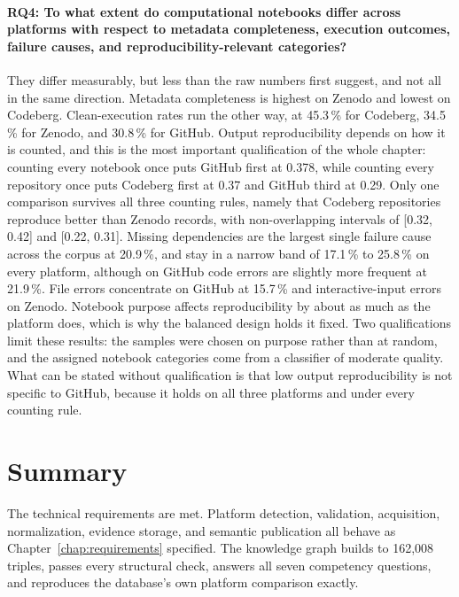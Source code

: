 \paragraph{RQ4: To what extent do computational notebooks differ across platforms with respect to metadata completeness, execution outcomes, failure causes, and reproducibility-relevant categories?}
They differ measurably, but less than the raw numbers first suggest, and not all in the same direction. Metadata completeness is highest on Zenodo and lowest on Codeberg. Clean-execution rates run the other way, at 45.3\,\% for Codeberg, 34.5\,\% for Zenodo, and 30.8\,\% for GitHub. Output reproducibility depends on how it is counted, and this is the most important qualification of the whole chapter: counting every notebook once puts GitHub first at 0.378, while counting every repository once puts Codeberg first at 0.37 and GitHub third at 0.29. Only one comparison survives all three counting rules, namely that Codeberg repositories reproduce better than Zenodo records, with non-overlapping intervals of [0.32, 0.42] and [0.22, 0.31]. Missing dependencies are the largest single failure cause across the corpus at 20.9\,\%, and stay in a narrow band of 17.1\,\% to 25.8\,\% on every platform, although on GitHub code errors are slightly more frequent at 21.9\,\%. File errors concentrate on GitHub at 15.7\,\% and interactive-input errors on Zenodo. Notebook purpose affects reproducibility by about as much as the platform does, which is why the balanced design holds it fixed. Two qualifications limit these results: the samples were chosen on purpose rather than at random, and the assigned notebook categories come from a classifier of moderate quality. What can be stated without qualification is that low output reproducibility is not specific to GitHub, because it holds on all three platforms and under every counting rule.

\section{Summary}
\label{sec:eval-summary}

The technical requirements are met. Platform detection, validation, acquisition, normalization, evidence storage, and semantic publication all behave as Chapter~\ref{chap:requirements} specified. The knowledge graph builds to 162{,}008 triples, passes every structural check, answers all seven competency questions, and reproduces the database's own platform comparison exactly.

